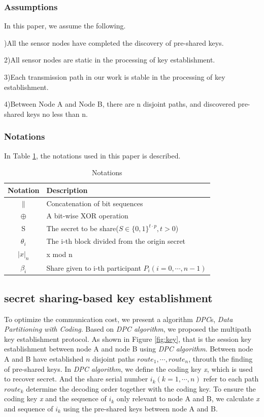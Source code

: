 \documentclass[nocopyrightspace,9pt]{sigplanconf}
\newcommand\lan[2]{{\left|{#1}\right|}_{#2}}
\begin{document}
\subsubsection*{Assumptions}
In this paper, we assume the following.

)All the sensor nodes have completed the discovery of pre-shared keys.

2)All sensor nodes are static in the processing of key establishment.

3)Each transmission path in our work is stable in the processing of key establishment.

4)Between Node A and Node B, there are n disjoint paths, and discovered
pre-shared keys no less than n.\\

\subsubsection*{Notations}
In Table \ref{tb:notation}, the notations used in this paper is described.
\begin{table}[htbp]
\caption{Notations}
\begin{tabular}{c|l}
  \hline
  Notation & Description\\ \hline
  $\parallel$ & Concatenation of bit sequences \\
  $\oplus$ & A bit-wise XOR operation \\
  S & The secret to be share($S\in\{0,1\}^{t\cdot p},t>0$) \\
  $\theta_i$ & The i-th block divided from the origin secret \\
  $\lan{x}{n}$ & x mod n \\
  $\beta_i$ & Share given to i-th participant $P_i(i=0,\cdots,n-1)$ \\ \hline
\end{tabular}
\label{tb:notation}
\end{table}
\subsection{secret sharing-based key establishment}
To optimize the communication cost, we present a algorithm \textit{DPC}s,
\textit{Data Partitioning with Coding}.
Based on \textit{DPC algorithm}, we proposed the multipath key establishment protocol.
As shown in Figure \ref{fig:key}, that is the session key establishment between node A and node B
using \textit{DPC algorithm}. Between node A and B have established $n$ disjoint paths
$route_1,\cdots,route_n$, throuth the finding of pre-shared keys. In \textit{DPC algorithm},
we define the coding key \textit{x}, which is used to recover secret. And the share serial
number $i_k(k=1,\cdots,n)$ refer to each path $route_k$ determine the decoding order
together with the coding key. To ensure the coding key \textit{x} and the sequence of $i_k$
only relevant to node A and B, we calculate \textit{x} and sequence of $i_k$ using the
pre-shared keys between node A and B.\\
\end{document}
